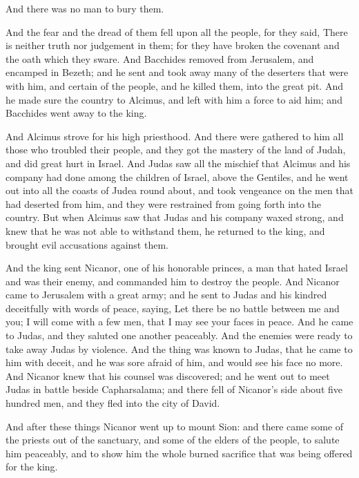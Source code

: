 {\par }{\Q And there was no man to bury them.
\par }{\PP {}And the fear and the dread of them fell upon all the people, for they said, There is neither truth nor judgement in them; for they have broken the covenant and the oath which they sware.
And Bacchides removed from Jerusalem, and encamped in Bezeth; and he sent and took away many of the deserters that were with him, and certain of the people, and he killed them,
{} into the great pit.
And he made sure the country to Alcimus, and left with him a force to aid him; and Bacchides went away to the king.
\par }{\PP {}And Alcimus strove for his high priesthood.
And there were gathered to him all those who troubled their people, and they got the mastery of the land of Judah, and did great hurt in Israel.
And Judas saw all the mischief that Alcimus and his company had done among the children of Israel,
{} above the Gentiles,
and he went out into all the coasts of Judea round about, and took vengeance on the men that had deserted from him, and they were restrained from going forth into the country.
But when Alcimus saw that Judas and his company waxed strong, and knew that he was not able to withstand them, he returned to the king, and brought evil accusations against them.
\par }{\PP {} And the king sent Nicanor, one of his honorable princes, a man that hated Israel and was their enemy, and commanded him to destroy the people.
And Nicanor came to Jerusalem with a great army; and he sent to Judas and his kindred deceitfully with words of peace, saying,
Let there be no battle between me and you; I will come with a few men, that I may see your faces in peace.
And he came to Judas, and they saluted one another peaceably. And the enemies were ready to take away Judas by violence.
And the thing was known to Judas,
{} that he came to him with deceit, and he was sore afraid of him, and would see his face no more.
And Nicanor knew that his counsel was discovered; and he went out to meet Judas in battle beside Capharsalama;
and there fell of Nicanor’s side about
 five hundred men, and they fled into the city of David.
\par }{\PP {}And after these things Nicanor went up to mount Sion: and there came some of the priests out of the sanctuary, and some of the elders of the people, to salute him peaceably, and to show him the whole burned sacrifice that was being offered for the king.
}
